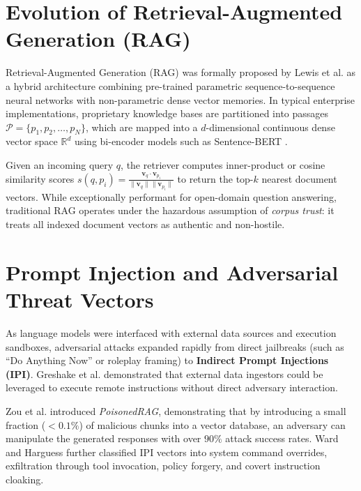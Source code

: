\label{chap:litreview}
\section{Evolution of Retrieval-Augmented Generation (RAG)}
Retrieval-Augmented Generation (RAG) was formally proposed by Lewis et al. \cite{lewis2020retrieval} as a hybrid architecture combining pre-trained parametric sequence-to-sequence neural networks with non-parametric dense vector memories. In typical enterprise implementations, proprietary knowledge bases are partitioned into passages $\mathcal{P} = \{p_1, p_2, \dots, p_N\}$, which are mapped into a $d$-dimensional continuous dense vector space $\mathbb{R}^d$ using bi-encoder models such as Sentence-BERT \cite{reimers2019sentence}. 

Given an incoming query $q$, the retriever computes inner-product or cosine similarity scores $s(q, p_i) = \frac{\mathbf{v}_q \cdot \mathbf{v}_{p_i}}{\|\mathbf{v}_q\| \|\mathbf{v}_{p_i}\|}$ to return the top-$k$ nearest document vectors. While exceptionally performant for open-domain question answering, traditional RAG operates under the hazardous assumption of \textit{corpus trust}: it treats all indexed document vectors as authentic and non-hostile.

\section{Prompt Injection and Adversarial Threat Vectors}
As language models were interfaced with external data sources and execution sandboxes, adversarial attacks expanded rapidly from direct jailbreaks (such as \enquote{Do Anything Now} or roleplay framing) to \textbf{Indirect Prompt Injections (IPI)}. Greshake et al. \cite{greshake2023not} demonstrated that external data ingestors could be leveraged to execute remote instructions without direct adversary interaction. 

Zou et al. \cite{zou2025poisonedrag} introduced \textit{PoisonedRAG}, demonstrating that by introducing a small fraction ($< 0.1\%$) of malicious chunks into a vector database, an adversary can manipulate the generated responses with over $90\%$ attack success rates. Ward and Harguess \cite{ward2025adversarial} further classified IPI vectors into system command overrides, exfiltration through tool invocation, policy forgery, and covert instruction cloaking.

